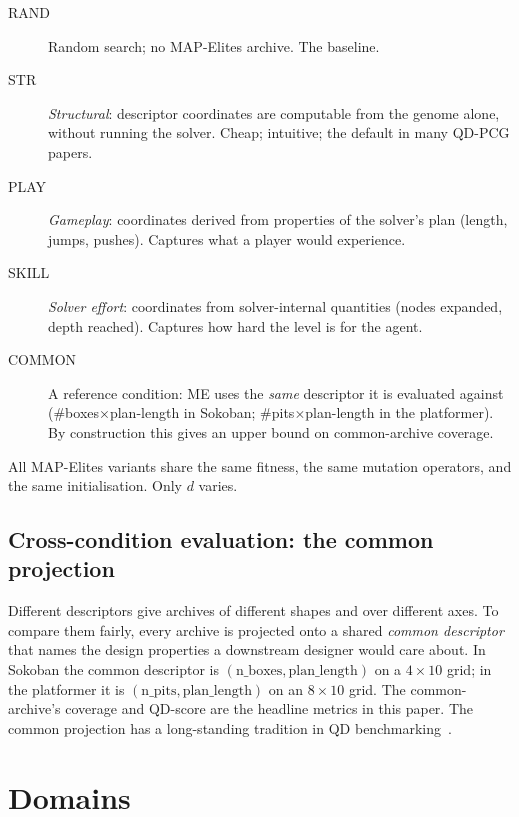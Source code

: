 \documentclass[conference]{IEEEtran}
\begin{document}
\begin{description}
  \item[\textsf{RAND}] Random search; no MAP-Elites archive. The
        baseline.
  \item[\textsf{STR}] \emph{Structural}: descriptor coordinates are
        computable from the genome alone, without running the
        solver. Cheap; intuitive; the default in many QD-PCG papers.
  \item[\textsf{PLAY}] \emph{Gameplay}: coordinates derived from
        properties of the solver's plan (length, jumps, pushes).
        Captures what a player would experience.
  \item[\textsf{SKILL}] \emph{Solver effort}: coordinates from
        solver-internal quantities (nodes expanded, depth reached).
        Captures how hard the level is for the agent.
  \item[\textsf{COMMON}] A reference condition: ME uses the
        \emph{same} descriptor it is evaluated against
        (\#boxes$\times$plan-length in Sokoban; \#pits$\times$plan-length
        in the platformer). By construction this gives an upper
        bound on common-archive coverage.
\end{description}

All MAP-Elites variants share the same fitness, the same mutation
operators, and the same initialisation. Only $d$ varies.

\subsection{Cross-condition evaluation: the common projection}

Different descriptors give archives of different shapes and over
different axes. To compare them fairly, every archive is projected
onto a shared \emph{common descriptor} that names the design
properties a downstream designer would care about. In Sokoban the
common descriptor is $(\text{n\_boxes}, \text{plan\_length})$ on a
$4\times 10$ grid; in the platformer it is $(\text{n\_pits},
\text{plan\_length})$ on an $8\times 10$ grid. The common-archive's
coverage and QD-score are the headline metrics in this paper. The
common projection has a long-standing tradition in QD
benchmarking~\cite{pugh2016quality, chatzilygeroudis2021qd}.

\section{Domains}
\label{sec:domains}
\end{document}
